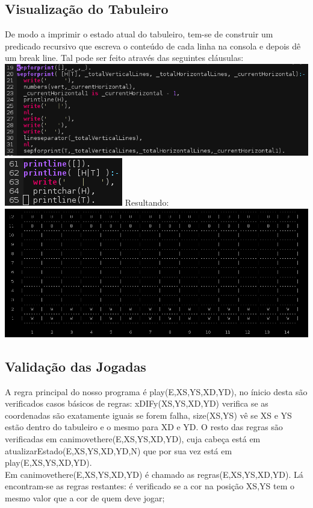 \documentclass[a4paper]{article}
\begin{document}
\subsection{Visualização do Tabuleiro}
De modo a imprimir o estado atual do tabuleiro, tem-se de construir um predicado recursivo que escreva o conteúdo de cada linha na consola e depois dê um break line. Tal pode ser feito através das seguintes cláusulas:
\includegraphics[scale=0.60]{imprimir.png}
\\\linebreak
\includegraphics[scale=0.50]{imprimir1.png}
Resultando:
\\\linebreak
\includegraphics[scale=0.40]{tabuleiro.png}

\subsection{Validação das Jogadas}
A regra principal do nosso programa é play(E,XS,YS,XD,YD), no ínicio desta são verificados casos básicos de regras: xDIFy(XS,YS,XD,YD) verifica se as coordenadas são exatamente iguais se forem falha, size(XS,YS) vê se XS e YS estão dentro do tabuleiro e o mesmo para XD e YD. O resto das regras são verificadas em canimovethere(E,XS,YS,XD,YD), cuja cabeça está em atualizarEstado(E,XS,YS,XD,YD,N) que por sua vez está em play(E,XS,YS,XD,YD).
\\\linebreak
Em canimovethere(E,XS,YS,XD,YD) é chamado as regras(E,XS,YS,XD,YD). Lá encontram-se as regras restantes: é verificado se a cor na posição XS,YS tem o mesmo valor que a cor de quem deve jogar;
\end{document}
